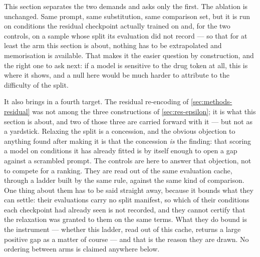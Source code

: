 This section separates the two demands and asks only the first. The ablation is
unchanged. Same prompt, same substitution, same comparison set, but it is
run on conditions the residual checkpoint actually trained on and, for the two
controls, on a sample whose split its evaluation did not record --- so that for at
least the arm this section is about, nothing has to be extrapolated and
memorisation is available. That makes it the easier question by
construction, and the right one to ask next: if a model is sensitive to the drug
token at all, this is where it shows, and a null here would be much harder to
attribute to the difficulty of the split.

It also brings in a fourth target. The residual re-encoding of
\cref{sec:methods-residual} was not among the three constructions of
\cref{sec:res-epsilon}; it is what this section is about, and two of those three
are carried forward with it --- but not as a yardstick. Relaxing the split is a
concession, and the obvious objection to anything found after making it is that
the concession \emph{is} the finding: that scoring a model on conditions it has
already fitted is by itself enough to open a gap against a scrambled prompt. The
controls are here to answer that objection, not to compete for a ranking. They are
read out of the same evaluation cache, through a ladder built by the same rule,
against the same kind of comparison. One thing about them has to be said straight
away, because it bounds what they can settle: their evaluations carry no split
manifest, so which of their conditions each checkpoint had already seen is not
recorded, and they cannot certify that the relaxation was granted to them on the
same terms. What they do bound is the instrument --- whether this ladder, read out
of this cache, returns a large positive gap as a matter of course --- and that is
the reason they are drawn. No ordering between arms is claimed anywhere below.

